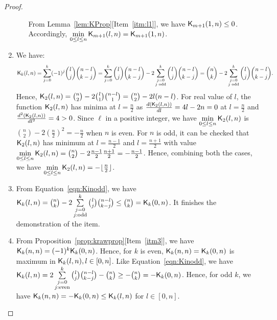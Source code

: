 \documentclass{llncs}
\begin{document}
\begin{proof}
\begin{enumerate}
\begin{enumerate}
From Lemma~\ref{lem:KProp}[Item~\ref{itm:l1}], we have $\mathsf{K}_{m+1}(1,n) \leq 0$. Accordingly, $\min\limits_{0 \leq l \leq n }\mathsf{K}_{m + 1}(l,n) = \mathsf{K}_{m + 1}(1,n)$.
\end{enumerate}
\item We have:
{\small
\begin{equation}\label{eqn:Kinodd}
\mathsf{K}_{k}(l,n) = \sum\limits_{j=0}^k(-1)^j{l \choose j}{n-l \choose k-j}
= \sum\limits_{j=0}^k {l \choose j}{n-l \choose k-j} - 2 \sum\limits_{\substack{j=0 \\ j\text{ odd}}}^k {l \choose j}{n-l \choose k-j}
= {n \choose k} - 2 \sum\limits_{\substack{j=0 \\ j \text{ odd}}}^k {l \choose j}{n-l \choose k-j}.
\end{equation}}
Hence, $\mathsf{K}_{2}(l,n) = {n \choose 2} - 2{l \choose 1}{n-l \choose 1} = {n \choose 2} - 2l(n-l)$. 
For real value of $l$, the function $\mathsf{K}_{2}(l,n)$ has minima at $l = \frac{n}{2}$ as $\frac{d(\mathsf{K}_{2}(l,n))}{dl} = 4l-2n = 0$ at $l = \frac{n}{2}$ and $\frac{d^2(\mathsf{K}_{2}(l,n))}{dl^2} = 4 > 0$. 
Since $\ell$ in a positive integer, we have $\min\limits_{0 \leq l \leq n} \mathsf{K}_{2}(l,n)$ is ${n \choose 2} - 2(\frac{n}{2})^2 = -\frac{n}{2}$ when $n$ is even. 
For $n$ is odd, it can be checked that $\mathsf{K}_{2}(l,n)$ has minimum at $l = \frac{n-1}{2}$ and $l = \frac{n+1}{2}$ with value $\min\limits_{0 \leq l \leq n} \mathsf{K}_{2}(l,n) =
{n \choose 2} - 2\frac{n-1}{2} \frac{n+1}{2}= -\frac{n-1}{2}$. 
Hence, combining both the cases, we have $\min\limits_{0 \leq l \leq n} \mathsf{K}_{2}(l,n) = -\lfloor \frac{n}{2} \rfloor$.
\item From Equation~\ref{eqn:Kinodd}, we have 
$\mathsf{K}_{k}(l,n) = {n \choose k} - 2 \sum\limits_{\substack{j=0 \\ j: \text{odd}}}^k {l \choose j}{n-l \choose k-j} \leq {n \choose k} = \mathsf{K}_{k}(0,n)$. %
It finishes the demonstration of the item.
\item From Proposition~\ref{prop:krawprop}[Item~\ref{itm3}], we have $\mathsf{K}_{k}(n,n) = (-1)^k \mathsf{K}_{k}(0,n)$. Hence, for $k$ is even, $\mathsf{K}_{k}(n,n) = \mathsf{K}_{k}(0,n)$ is maximum in $\mathsf{K}_{k}(l,n), l\in [0,n]$.
Like Equation~\ref{eqn:Kinodd}, we have $\mathsf{K}_{k}(l,n) = 2 \sum\limits_{\substack{j=0 \\ j: \text{even}}}^k {l \choose j}{n-l \choose k-j} - {n \choose k} \geq - {n \choose k} = -\mathsf{K}_{k}(0,n)$.
Hence, for odd $k$, we have $\mathsf{K}_{k}(n,n) = -\mathsf{K}_{k}(0,n) \leq \mathsf{K}_{k}(l,n)$ for $l \in [0,n]$. %
\end{enumerate}
\end{proof}
\end{document}
